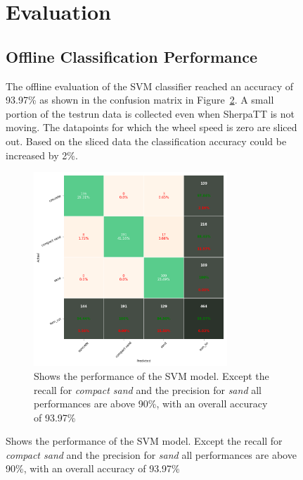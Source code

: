\documentclass{article}
\begin{document}
\begin{figure}[!htb]
\section{Evaluation}
\subsection{Offline Classification Performance}

The offline evaluation of the SVM classifier reached an accuracy of 93.97\% as shown in the confusion matrix in Figure~\ref{fig:confusionmatrix}. A small portion of the testrun data is collected even when SherpaTT is not moving. The datapoints for which the wheel speed is zero are sliced out. Based on the sliced data  the classification accuracy could be increased by 2\%.

\begin{figure}[h]
\centering
\includegraphics[width=0.8\textwidth]{../figures/confusionmatrix_Train.png}
\caption{\label{fig:confusionmatrix} Shows the performance of the SVM model. Except the recall for \emph{compact sand} and the precision for \emph{sand} all performances are above 90\%, with an overall accuracy of 93.97\%}
\end{figure}


\end{figure}
\end{document}
